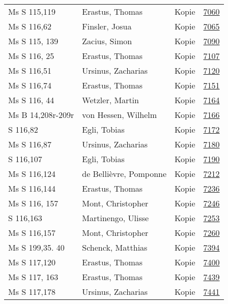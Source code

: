 \documentclass[10pt,a4paper,landscape]{report}
\begin{document}
\begin{longtable}{p{16cm}p{4cm}lr}
Ms S 115,119	&	Erastus, Thomas	&	Kopie	&	\href{http://130.60.24.72/assignment/7060}{7060}\\
Ms S 116,62	&	Finsler, Josua	&	Kopie	&	\href{http://130.60.24.72/assignment/7065}{7065}\\
Ms S 115, 139	&	Zacius, Simon	&	Kopie	&	\href{http://130.60.24.72/assignment/7090}{7090}\\
Ms S 116, 25	&	Erastus, Thomas	&	Kopie	&	\href{http://130.60.24.72/assignment/7107}{7107}\\
Ms S 116,51	&	Ursinus, Zacharias	&	Kopie	&	\href{http://130.60.24.72/assignment/7120}{7120}\\
Ms S 116,74	&	Erastus, Thomas	&	Kopie	&	\href{http://130.60.24.72/assignment/7151}{7151}\\
Ms S 116, 44	&	Wetzler, Martin	&	Kopie	&	\href{http://130.60.24.72/assignment/7164}{7164}\\
Ms B 14,208r-209r	&	von Hessen, Wilhelm	&	Kopie	&	\href{http://130.60.24.72/assignment/7166}{7166}\\
S 116,82	&	Egli, Tobias	&	Kopie	&	\href{http://130.60.24.72/assignment/7172}{7172}\\
Ms S 116,87	&	Ursinus, Zacharias	&	Kopie	&	\href{http://130.60.24.72/assignment/7180}{7180}\\
S 116,107	&	Egli, Tobias	&	Kopie	&	\href{http://130.60.24.72/assignment/7190}{7190}\\
Ms S 116,124	&	de Bellièvre, Pomponne	&	Kopie	&	\href{http://130.60.24.72/assignment/7212}{7212}\\
Ms S 116,144	&	Erastus, Thomas	&	Kopie	&	\href{http://130.60.24.72/assignment/7236}{7236}\\
Ms S 116, 157	&	Mont, Christopher	&	Kopie	&	\href{http://130.60.24.72/assignment/7246}{7246}\\
S 116,163	&	Martinengo, Ulisse	&	Kopie	&	\href{http://130.60.24.72/assignment/7253}{7253}\\
Ms S 116,157	&	Mont, Christopher	&	Kopie	&	\href{http://130.60.24.72/assignment/7260}{7260}\\
Ms S 199,35. 40	&	Schenck, Matthias	&	Kopie	&	\href{http://130.60.24.72/assignment/7394}{7394}\\
Ms S 117,120	&	Erastus, Thomas	&	Kopie	&	\href{http://130.60.24.72/assignment/7400}{7400}\\
Ms S 117, 163	&	Erastus, Thomas	&	Kopie	&	\href{http://130.60.24.72/assignment/7439}{7439}\\
Ms S 117,178	&	Ursinus, Zacharias	&	Kopie	&	\href{http://130.60.24.72/assignment/7441}{7441}\\

\end{longtable}
\end{document}
